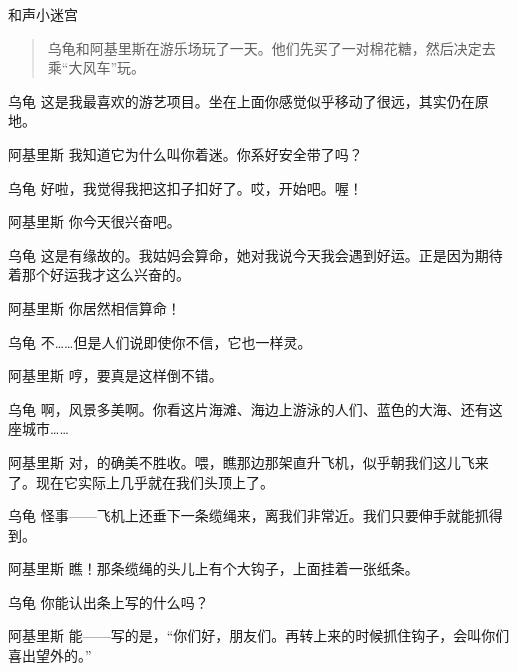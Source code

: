 
\begin{dialog}{和声小迷宫}

\begin{quote}
乌龟和阿基里斯在游乐场玩了一天。他们先买了一对棉花糖，然后决定去乘“大风车”玩。
\end{quote}

\setnamewidth{2\ccwd}

\begin{dialogue}

\item[乌龟]这是我最喜欢的游艺项目。坐在上面你感觉似乎移动了很远，其实仍在原地。

\item[阿基里斯]我知道它为什么叫你着迷。你系好安全带了吗？

\item[乌龟]好啦，我觉得我把这扣子扣好了。哎，开始吧。喔！

\item[阿基里斯]你今天很兴奋吧。

\item[乌龟]这是有缘故的。我姑妈会算命，她对我说今天我会遇到好运。正是因为期待着那个好运我才这么兴奋的。

\item[阿基里斯]你居然相信算命！

\item[乌龟]不……但是人们说即使你不信，它也一样灵。

\item[阿基里斯]哼，要真是这样倒不错。

\item[乌龟]啊，风景多美啊。你看这片海滩、海边上游泳的人们、蓝色的大海、还有这座城市……

\item[阿基里斯]对，的确美不胜收。喂，瞧那边那架直升飞机，似乎朝我们这儿飞来了。现在它实际上几乎就在我们头顶上了。

\item[乌龟]怪事——飞机上还垂下一条缆绳来，离我们非常近。我们只要伸手就能抓得到。

\item[阿基里斯]瞧！那条缆绳的头儿上有个大钩子，上面挂着一张纸条。


\item[乌龟]你能认出条上写的什么吗？

\item[阿基里斯]能——写的是，“你们好，朋友们。再转上来的时候抓住钩子，会叫你们喜出望外的。”


\end{dialogue}
\end{dialog}
